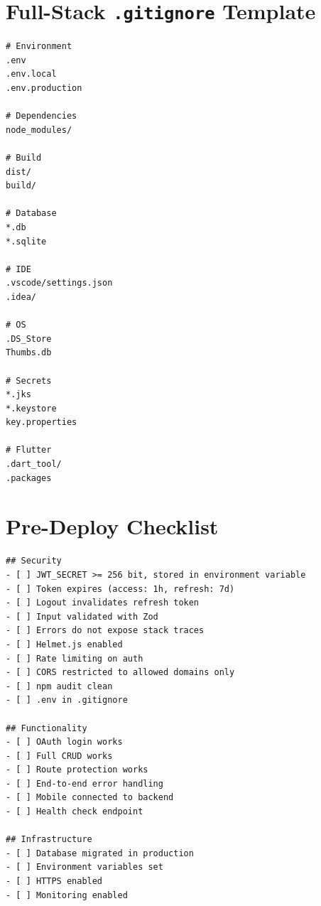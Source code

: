 \section{Full-Stack \texttt{.gitignore} Template}

\begin{lstlisting}[language={}]
# Environment
.env
.env.local
.env.production

# Dependencies
node_modules/

# Build
dist/
build/

# Database
*.db
*.sqlite

# IDE
.vscode/settings.json
.idea/

# OS
.DS_Store
Thumbs.db

# Secrets
*.jks
*.keystore
key.properties

# Flutter
.dart_tool/
.packages
\end{lstlisting}

\section{Pre-Deploy Checklist}

\begin{lstlisting}[language={}]
## Security
- [ ] JWT_SECRET >= 256 bit, stored in environment variable
- [ ] Token expires (access: 1h, refresh: 7d)
- [ ] Logout invalidates refresh token
- [ ] Input validated with Zod
- [ ] Errors do not expose stack traces
- [ ] Helmet.js enabled
- [ ] Rate limiting on auth
- [ ] CORS restricted to allowed domains only
- [ ] npm audit clean
- [ ] .env in .gitignore

## Functionality
- [ ] OAuth login works
- [ ] Full CRUD works
- [ ] Route protection works
- [ ] End-to-end error handling
- [ ] Mobile connected to backend
- [ ] Health check endpoint

## Infrastructure
- [ ] Database migrated in production
- [ ] Environment variables set
- [ ] HTTPS enabled
- [ ] Monitoring enabled
\end{lstlisting}
